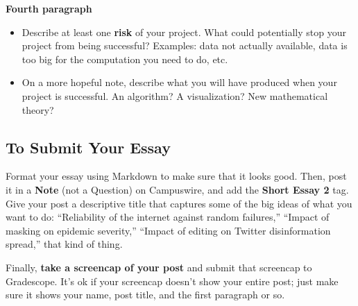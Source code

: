 \documentclass{hw}
\begin{document}
    \textbf{Fourth paragraph}
    \begin{itemize}
        \item Describe at least one \textbf{risk} of your project. 
        What could potentially stop your project from being successful? 
        Examples: data not actually available, data is too big for the computation you need to do, etc. 
        \item On a more hopeful note, describe what you will have produced when your project is successful. 
        An algorithm? 
        A visualization? 
        New mathematical theory? 
    \end{itemize}

\pagebreak

\subsection*{To Submit Your Essay}

Format your essay using Markdown to make sure that it looks good. 
Then, post it in a \textbf{Note} (not a Question)  on Campuswire, and add the \textbf{Short Essay 2} tag. 
Give your post a descriptive title that captures some of the big ideas of what you want to do: ``Reliability of the internet against random failures,'' ``Impact of masking on epidemic severity,'' ``Impact of editing on Twitter disinformation spread,'' that kind of thing. 

Finally, \textbf{take a screencap of your post} and submit that screencap to Gradescope. 
It's ok if your screencap doesn't show your entire post; just make sure it shows your name, post title, and the first paragraph or so. 
\end{document}
